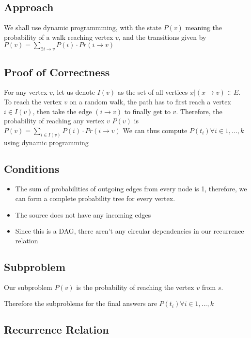 \documentclass{article}
\begin{document}
\subsection{Approach}

We shall use dynamic programmming, with the state $P(v)$ meaning the probability of a walk reaching vertex $v$, and the transitions given by
$P(v) = \sum_{\exists i \rightarrow v}P(i)\cdot Pr(i \rightarrow v)$

\subsection{Proof of Correctness}
For any vertex $v$, let us denote $I(v)$ as the set of all vertices $x | (x \rightarrow v) \in E$. 
To reach the vertex $v$ on a random walk, the path has to first reach a vertex $i \in I(v)$, then take the edge $(i \rightarrow v)$ to finally get to $v$. Therefore, the probability of reaching any vertex $v$ $P(v)$ is
\newline
$P(v) = \sum_{i \in I(v)}P(i)\cdot Pr(i \rightarrow v)$ 
\newline
We can thus compute $P(t_i) \forall i \in {1,...,k}$ using dynamic programming 

\subsection{Conditions} 
\begin{itemize}
\item The sum of probabilities of outgoing edges from every node is 1, therefore, we can form a complete probability tree for every vertex.
\item The source does not have any incoming edges
\item Since this is a DAG, there aren't any circular dependencies in our recurrence relation
\end{itemize}

\subsection{Subproblem}
Our subproblem $P(v)$ is the probability of reaching the vertex $v$ from $s$.

Therefore the subproblems for the final answers are $P(t_i) \forall i \in {1,...,k}$

\subsection{Recurrence Relation}
\end{document}
